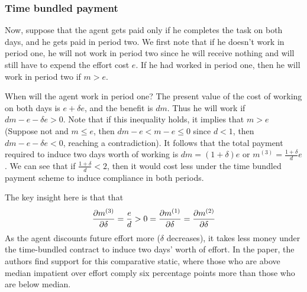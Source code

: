 \subsubsection*{Time bundled payment}
Now, suppose that the agent gets paid only if he completes the task on both days, and he gets paid in period two. We first note that if he doesn't work in period one, he will not work in period two since he will receive nothing and will still have to expend the effort cost $e$. If he had worked in period one, then he will work in period two if $m > e$. 

When will the agent work in period one? The present value of the cost of working on both days is $e + \delta e$, and the benefit is $dm$. Thus he will work if $dm - e - \delta e > 0$. Note that if this inequality holds, it implies that $m > e$ (Suppose not and $m \leq e$, then $dm - e < m - e \leq 0$ since  $d < 1$, then $dm- e - \delta e < 0$, reaching a contradiction). It follows that the total payment required to induce two days worth of working is $dm = (1 + \delta)e$ or $m^{(3)} = \frac{1 + \delta}{d}e$. We can see that if $\frac{1 + \delta}{d} < 2$, then it would cost less under the time bundled payment scheme to induce compliance in both periods. 

The key insight here is that that 
$$\frac{\partial m^{(3)}}{\partial \delta} = \frac{e}{d} > 0 = \frac{\partial m^{(1)}}{\partial \delta} = \frac{\partial m^{(2)}}{\partial \delta}$$
As the agent discounts future effort more ($\delta$ decreases), it takes less money under the time-bundled contract to induce two days' worth of effort. In the paper, the authors find support for this comparative static, where those who are above median impatient over effort comply six percentage points more than those who are below median.
